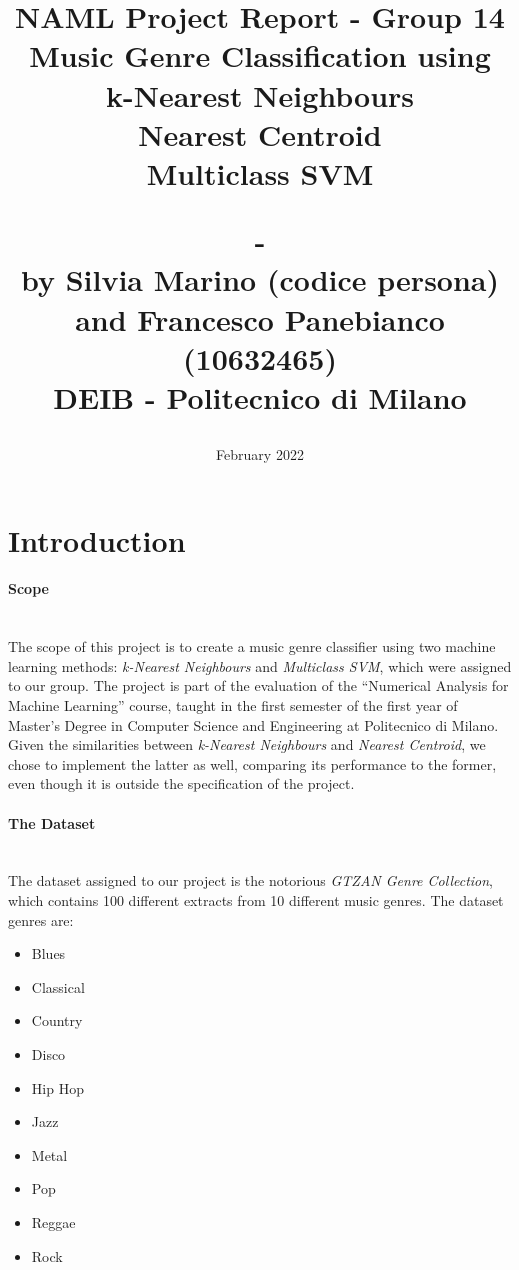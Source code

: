 \documentclass[12pt]{article}
\begin{document}
	\title{NAML Project Report - Group 14\\\vspace{20pt}
		\Large{Music Genre Classification using}\\
		\large{k-Nearest Neighbours\\ Nearest Centroid\\ Multiclass SVM}\\
		\date{February 2022}
		\large{-\\}
		\large{by Silvia Marino (codice persona) and Francesco Panebianco (10632465)\\}
		\small{DEIB - Politecnico di Milano}
	}
	\maketitle
	\tableofcontents
	\newpage
	\section{Introduction}
	\paragraph{Scope}\mbox{}\\\newline
	The scope of this project is to create a music genre classifier using two machine learning methods: \textit{k-Nearest Neighbours} and \textit{Multiclass SVM}, which were assigned to our group. The project is part of the evaluation of the “Numerical Analysis for Machine Learning” course, taught in the first semester of the first year of Master’s Degree in Computer Science and Engineering at Politecnico di Milano. Given the similarities between \textit{k-Nearest Neighbours} and \textit{Nearest Centroid}, we chose to implement the latter as well, comparing its performance to the former, even though it is outside the specification of the project.\\ 
	
	\paragraph{The Dataset}\mbox{}\\\newline
	The dataset assigned to our project is the notorious \textit{GTZAN Genre Collection}\cite{marsyas}, which contains 100 different extracts from 10 different music genres. The dataset genres are: 
	
	\begin{itemize}
		\item Blues 
		\item Classical 
		\item Country 
		\item Disco 
		\item Hip Hop 	
		\item Jazz 
		\item Metal 
		\item Pop 
		\item Reggae 
		\item Rock 
	\end{itemize}
\end{document}
